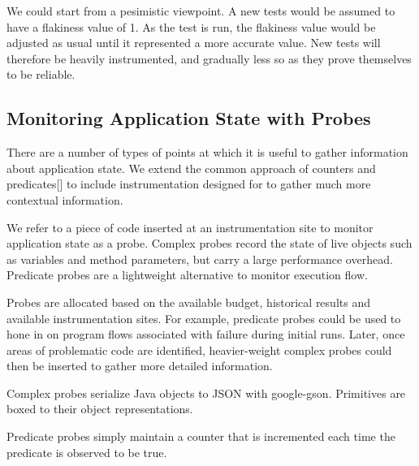 {We could start from a pesimistic viewpoint. A new tests would be assumed to have
a flakiness value of 1. As the test is run, the flakiness value would be
adjusted as usual until it represented a more accurate value. New tests will
therefore be heavily instrumented, and gradually less so as they prove
themselves to be reliable.

\subsection{Monitoring Application State with Probes}

There are a number of types of points at which it is useful to gather
information about application state. We extend the common approach of counters
and predicates[] to include instrumentation designed for to gather much more
contextual information.

We refer to a piece of code inserted at an instrumentation site to monitor
application state as a probe. Complex probes record the state of live objects
such as variables and method parameters, but carry a large performance overhead.
Predicate probes are a lightweight alternative to monitor execution flow.

Probes are allocated based on the available budget, historical results and
available instrumentation sites. For example, predicate probes could be used to
hone in on program flows associated with failure during initial runs. Later,
once areas of problematic code are identified, heavier-weight complex probes
could then be inserted to gather more detailed information.

Complex probes serialize Java objects to JSON with google-gson. Primitives are
boxed to their object representations.

Predicate probes simply maintain a counter that is incremented each time the
predicate is observed to be true.

}
